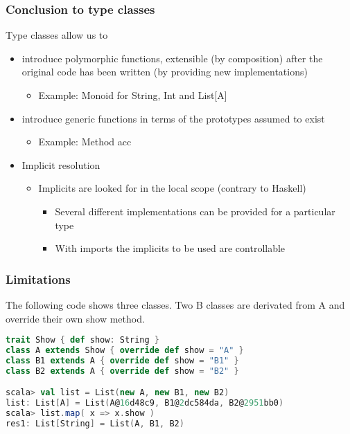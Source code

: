 \hypertarget{conclusion-to-type-classes}{%
\subsubsection{Conclusion to type
classes}\label{conclusion-to-type-classes}}

Type classes allow us to

\begin{itemize}
\tightlist
\item
  introduce polymorphic functions, extensible (by composition) after the
  original code has been written (by providing new implementations)

  \begin{itemize}
  \tightlist
  \item
    Example: Monoid for String, Int and List{[}A{]}
  \end{itemize}
\item
  introduce generic functions in terms of the prototypes assumed to
  exist

  \begin{itemize}
  \tightlist
  \item
    Example: Method acc
  \end{itemize}
\item
  Implicit resolution

  \begin{itemize}
  \tightlist
  \item
    Implicits are looked for in the local scope (contrary to Haskell)

    \begin{itemize}
    \tightlist
    \item
      Several different implementations can be provided for a particular
      type
    \item
      With imports the implicits to be used are controllable
    \end{itemize}
  \end{itemize}
\end{itemize}

\clearpage
\hypertarget{limitations}{%
\subsubsection{Limitations}\label{limitations}}

The following code shows three classes. Two B classes are derivated from
A and override their own show method.

\begin{lstlisting}[language=scala,mathescape=false]
trait Show { def show: String }
class A extends Show { override def show = "A" }
class B1 extends A { override def show = "B1" }
class B2 extends A { override def show = "B2" }

scala> val list = List(new A, new B1, new B2)
list: List[A] = List(A@16d48c9, B1@2dc584da, B2@2951bb0)
scala> list.map( x => x.show )
res1: List[String] = List(A, B1, B2)
\end{lstlisting}

